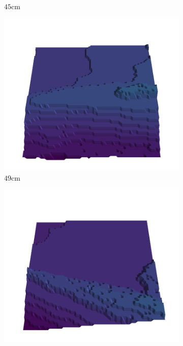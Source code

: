 \documentclass[../document.tex]{subfiles}
\begin{document}
\begin{figure}[htbp]
\begin{subfigure}[b]{0.19\textwidth}
    \caption{$45$cm}
    \end{subfigure}
    \begin{subfigure}[b]{0.19\textwidth}
    \includegraphics[width=\linewidth]{../img/5/quarry/all/best/49-patch-3d-majavi-colormap-4.png}
    \caption{$49$cm}
    \end{subfigure}
    \begin{subfigure}[b]{0.19\textwidth}
    \includegraphics[width=\linewidth]{../img/5/quarry/all/best/51-patch-3d-majavi-colormap-5.png}

\end{subfigure}
\end{figure}
\end{document}

